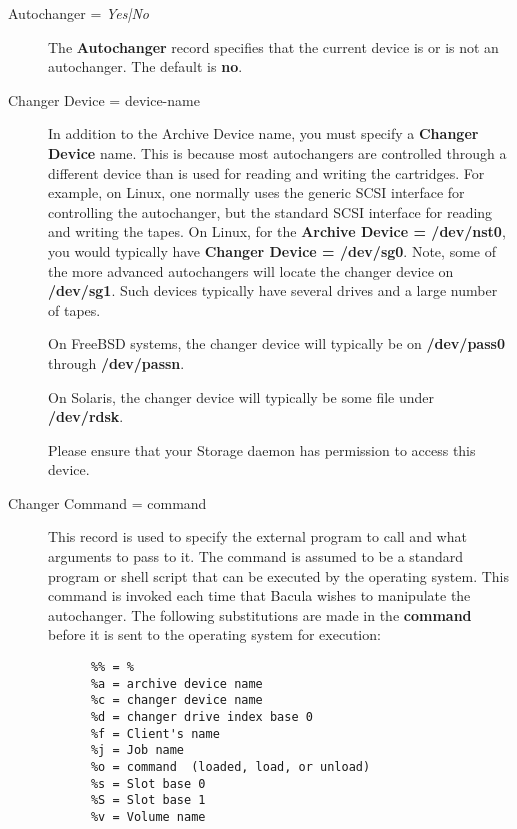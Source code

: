 \begin{description}

\item [Autochanger = {\it Yes|No} ]
   The {\bf Autochanger} record specifies that the current device  is or is not
an autochanger. The default is {\bf no}.  

\item [Changer Device = \lt{}device-name\gt{}]
   In addition to the Archive Device name, you must specify a  {\bf Changer
Device} name. This is because most autochangers are  controlled through a
different device than is used for reading and  writing the cartridges. For
example, on Linux, one normally uses the generic SCSI interface for
controlling the autochanger, but the standard SCSI interface for reading and
writing the  tapes. On Linux, for the {\bf Archive Device = /dev/nst0},  you
would typically have {\bf Changer Device = /dev/sg0}.  Note, some of the more
advanced autochangers will locate the changer device on {\bf /dev/sg1}. Such
devices typically have  several drives and a large number of tapes.  

On FreeBSD systems, the changer device will typically be on {\bf /dev/pass0}
through {\bf /dev/passn}.  

On Solaris, the changer device will typically be some file under {\bf
/dev/rdsk}.  

Please ensure that your Storage daemon has permission to access this
device.

\item [Changer Command = \lt{}command\gt{}]
   This record is used to specify the external program to call  and what
arguments to pass to it. The command is assumed to be  a standard program or
shell script that can be executed by  the operating system. This command is
invoked each time that Bacula wishes to manipulate the autochanger.  The
following substitutions are made in the {\bf command}  before it is sent to
the operating system for execution:  

\footnotesize
\begin{verbatim}
      %% = %
      %a = archive device name
      %c = changer device name
      %d = changer drive index base 0
      %f = Client's name
      %j = Job name
      %o = command  (loaded, load, or unload)
      %s = Slot base 0
      %S = Slot base 1
      %v = Volume name
\end{verbatim}
\normalsize


\end{description}

